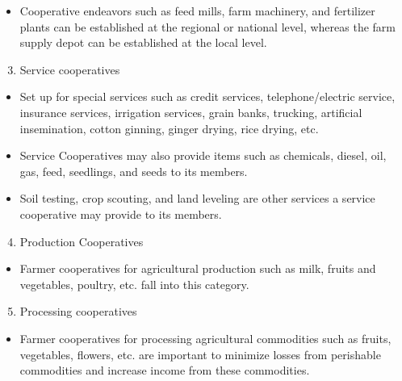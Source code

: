 \documentclass[12pt,ignorenonframetext,aspectratio=169]{beamer}
\providecommand{\tightlist}{%
  \setlength{\itemsep}{0pt}\setlength{\parskip}{0pt}}
\begin{document}
\begin{frame}{}
\protect\hypertarget{section}{}
\footnotesize

\begin{itemize}
\tightlist
\item
  Cooperative endeavors such as feed mills, farm machinery, and
  fertilizer plants can be established at the regional or national
  level, whereas the farm supply depot can be established at the local
  level.
\end{itemize}

\begin{enumerate}
\setcounter{enumi}{2}
\tightlist
\item
  Service cooperatives
\end{enumerate}

\begin{itemize}
\tightlist
\item
  Set up for special services such as credit services,
  telephone/electric service, insurance services, irrigation services,
  grain banks, trucking, artificial insemination, cotton ginning, ginger
  drying, rice drying, etc.
\item
  Service Cooperatives may also provide items such as chemicals, diesel,
  oil, gas, feed, seedlings, and seeds to its members.
\item
  Soil testing, crop scouting, and land leveling are other services a
  service cooperative may provide to its members.
\end{itemize}
\end{frame}

\begin{frame}{}
\protect\hypertarget{section-1}{}
\footnotesize

\begin{enumerate}
\setcounter{enumi}{3}
\tightlist
\item
  Production Cooperatives
\end{enumerate}

\begin{itemize}
\tightlist
\item
  Farmer cooperatives for agricultural production such as milk, fruits
  and vegetables, poultry, etc. fall into this category.
\end{itemize}

\begin{enumerate}
\setcounter{enumi}{4}
\tightlist
\item
  Processing cooperatives
\end{enumerate}

\begin{itemize}
\tightlist
\item
  Farmer cooperatives for processing agricultural commodities such as
  fruits, vegetables, flowers, etc. are important to minimize losses
  from perishable commodities and increase income from these
  commodities.
\end{itemize}
\end{frame}
\end{document}
